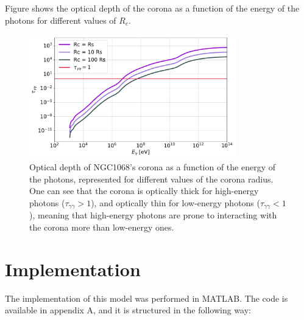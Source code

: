 Figure  shows the optical depth of the corona as a function of the energy of the photons for different values of $R_c$.

\begin{figure}[ht]
    \includegraphics[width=0.8\textwidth]{Figures/OpticalDepths.pdf}
    \centering
    \caption{Optical depth of NGC1068's corona as a function of the energy of the photons, represented for different values of the corona radius. One can see that the corona is optically thick for high-energy photons ($\tau_{\gamma\gamma}>1$), and optically thin for low-energy photons ($\tau_{\gamma\gamma}<1$), meaning that high-energy photons are prone to interacting with the corona more than low-energy ones.}
    \label{fig:optical_depth_as_function_of_corona_radius}
\end{figure}


\section{Implementation}

The implementation of this model was performed in MATLAB. The code is available in appendix A, and it is structured in the following way:

